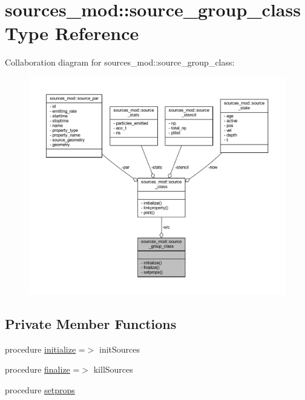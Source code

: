 \hypertarget{structsources__mod_1_1source__group__class}{}\section{sources\+\_\+mod\+:\+:source\+\_\+group\+\_\+class Type Reference}
\label{structsources__mod_1_1source__group__class}


Collaboration diagram for sources\+\_\+mod\+:\+:source\+\_\+group\+\_\+class\+:\nopagebreak
\begin{figure}[H]
\begin{center}
\leavevmode
\includegraphics[width=350pt]{structsources__mod_1_1source__group__class__coll__graph}
\end{center}
\end{figure}
\subsection*{Private Member Functions}
\begin{DoxyCompactItemize}
\item 
procedure \mbox{\hyperlink{structsources__mod_1_1source__group__class_a186abc677118adbf1f9cff405dac330e}{initialize}} =$>$ init\+Sources
\item 
procedure \mbox{\hyperlink{structsources__mod_1_1source__group__class_ab1f12af6502f7e468e07d82555ea5cb9}{finalize}} =$>$ kill\+Sources
\item 
procedure \mbox{\hyperlink{structsources__mod_1_1source__group__class_af66df271111f0d2734b1e5122e42438e}{setprops}}
\end{DoxyCompactItemize}
